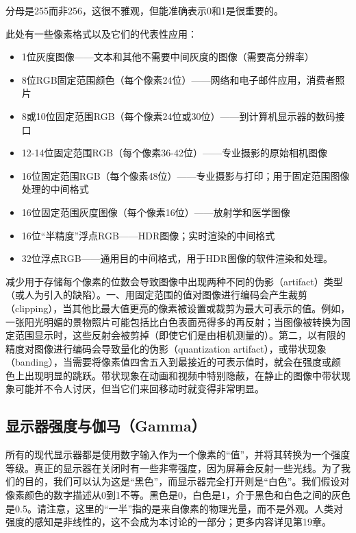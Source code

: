 \documentclass[lang=cn,12pt]{elegantbook}
\begin{document}
\begin{note}
分母是255而非256，这很不雅观，但能准确表示0和1是很重要的。
\end{note}

此处有一些像素格式以及它们的代表性应用：

\begin{itemize}
  \item 1位灰度图像——文本和其他不需要中间灰度的图像（需要高分辨率）
  \item 8位RGB固定范围颜色（每个像素24位）——网络和电子邮件应用，消费者照片
  \item 8或10位固定范围RGB（每个像素24位或30位）——到计算机显示器的数码接口
  \item 12-14位固定范围RGB（每个像素36-42位）——专业摄影的原始相机图像
  \item 16位固定范围RGB（每个像素48位）——专业摄影与打印；用于固定范围图像处理的中间格式
  \item 16位固定范围灰度图像（每个像素16位）——放射学和医学图像
  \item 16位“半精度”浮点RGB——HDR图像；实时渲染的中间格式
  \item 32位浮点RGB——通用目的中间格式，用于HDR图像的软件渲染和处理。
\end{itemize}

减少用于存储每个像素的位数会导致图像中出现两种不同的伪影（artifact）类型（或人为引入的缺陷）。一、用固定范围的值对图像进行编码会产生裁剪（clipping），当其他比最大值更亮的像素被设置或裁剪为最大可表示的值。例如，一张阳光明媚的景物照片可能包括比白色表面亮得多的再反射；当图像被转换为固定范围显示时，这些反射会被剪掉（即使它们是由相机测量的）。第二，以有限的精度对图像进行编码会导致量化的伪影（quantization artifact），或带状现象（banding），当需要将像素值四舍五入到最接近的可表示值时，就会在强度或颜色上出现明显的跳跃。带状现象在动画和视频中特别隐蔽，在静止的图像中带状现象可能并不令人讨厌，但当它们来回移动时就变得非常明显。

\subsection{显示器强度与伽马（Gamma）}

所有的现代显示器都是使用数字输入作为一个像素的“值”，并将其转换为一个强度等级。真正的显示器在关闭时有一些非零强度，因为屏幕会反射一些光线。为了我们的目的，我们可以认为这是“黑色”，而显示器完全打开则是“白色”。我们假设对像素颜色的数字描述从0到1不等。黑色是0，白色是1，介于黑色和白色之间的灰色是0.5。请注意，这里的“一半”指的是来自像素的物理光量，而不是外观。人类对强度的感知是非线性的，这不会成为本讨论的一部分；更多内容详见第19章。
\end{document}

